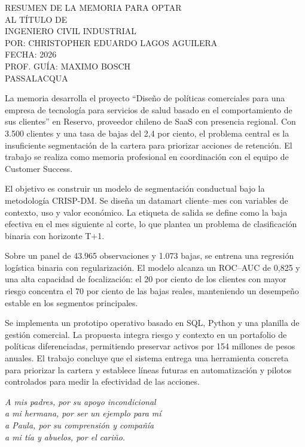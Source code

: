 \documentclass[
    spanish, %
    letterpaper, oneside
]{article}
\renewenvironment{abstractd}{%
    \pagestyle{plain} 
    
    \vspace*{-1cm} 
    \noindent\hfill 
    \begin{minipage}{0.5\textwidth} 
        \normalsize 
        RESUMEN DE LA MEMORIA PARA OPTAR\\
        AL TÍTULO DE\\
        INGENIERO CIVIL INDUSTRIAL\\
        POR: CHRISTOPHER EDUARDO LAGOS AGUILERA\\
        FECHA: 2026\\
        PROF. GUÍA: MAXIMO BOSCH \\ 
        PASSALACQUA
    \end{minipage}
    \vspace{0.5cm} 
    
    \sectionfont{\color{\sectioncolor} \sectionfontsize \sectionfontstyle \selectfont}%
    \sectionanumnoiheadless{\nameabstract}%
    
    \thispagestyle{plain} 
}{%
    \pagestyle{plain} %
}
\newenvironment{dedicatoria}{%
    \pagestyle{plain} %
    \sectionfont{\color{\sectioncolor} \sectionfontsize \sectionfontstyle \selectfont}%
    \thispagestyle{plain} %
}{%
}
\begin{document}
\templatePortrait

\templatePagecfg %
\pagestyle{plain} %


\begin{abstractd}
La memoria desarrolla el proyecto ``Diseño de políticas comerciales para una empresa de tecnología para servicios de salud basado en el comportamiento de sus clientes'' en Reservo, proveedor chileno de SaaS con presencia regional. Con 3.500 clientes y una tasa de bajas del 2,4 por ciento, el problema central es la insuficiente segmentación de la cartera para priorizar acciones de retención. El trabajo se realiza como memoria profesional en coordinación con el equipo de Customer Success.

El objetivo es construir un modelo de segmentación conductual bajo la metodología CRISP-DM. Se diseña un datamart cliente–mes con variables de contexto, uso y valor económico. La etiqueta de salida se define como la baja efectiva en el mes siguiente al corte, lo que plantea un problema de clasificación binaria con horizonte T+1.

Sobre un panel de 43.965 observaciones y 1.073 bajas, se entrena una regresión logística binaria con regularización. El modelo alcanza un ROC–AUC de 0,825 y una alta capacidad de focalización: el 20 por ciento de los clientes con mayor riesgo concentra el 70 por ciento de las bajas reales, manteniendo un desempeño estable en los segmentos principales.

Se implementa un prototipo operativo basado en SQL, Python y una planilla de gestión comercial. La propuesta integra riesgo y contexto en un portafolio de políticas diferenciadas, permitiendo preservar activos por 154 millones de pesos anuales. El trabajo concluye que el sistema entrega una herramienta concreta para priorizar la cartera y establece líneas futuras en automatización y pilotos controlados para medir la efectividad de las acciones.
\end{abstractd}


\newpage
\begin{dedicatoria}
    \vspace*{2cm}
    \begin{flushright}
        \textit{A mis padres, por su apoyo incondicional\\
        a mi hermana, por ser un ejemplo para mí\\
        a Paula, por su comprensión y compañía\\
        a mi tía y abuelos, por el cariño.}
    \end{flushright}
\end{dedicatoria}
\end{document}
